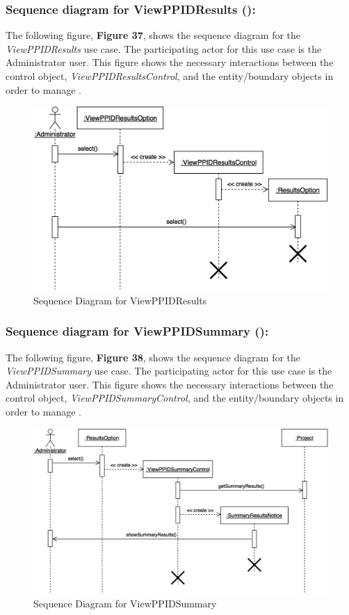 \documentclass[12pt,letterpaper]{article}
\begin{document}
\subsubsection*{Sequence diagram for ViewPPIDResults (\viewppidresults{}):}

The following figure, {\bf Figure 37}, shows the sequence diagram for the {\it ViewPPIDResults} use case. The participating actor for this use case is
the Administrator user. This figure shows the necessary interactions between the control object, {\it ViewPPIDResultsControl}, and the
entity/boundary objects in order to manage \viewppidresults{}.

\begin{figure}[H]
	\centering{}
	\includegraphics[scale=0.3]{imgs/seq/view-ppid-results.png}
	\caption{Sequence Diagram for ViewPPIDResults}
\end{figure}

\subsubsection*{Sequence diagram for ViewPPIDSummary (\viewppidsummary{}):}

The following figure, {\bf Figure 38}, shows the sequence diagram for the {\it ViewPPIDSummary} use case. The participating actor for this use case is
the Administrator user. This figure shows the necessary interactions between the control object, {\it ViewPPIDSummaryControl}, and the
entity/boundary objects in order to manage \viewppidsummary{}.

\begin{figure}[H]
	\centering{}
	\includegraphics[scale=0.3]{imgs/seq/view-ppid-summary.png}
	\caption{Sequence Diagram for ViewPPIDSummary}
\end{figure}
\end{document}
